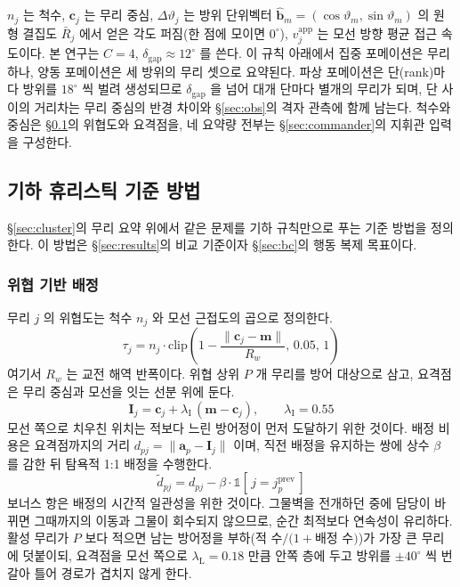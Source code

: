 $n_j$ 는 척수, $\mathbf{c}_j$ 는 무리 중심, $\Delta\vartheta_j$ 는 방위 단위벡터
$\hat{\mathbf{b}}_m = (\cos\vartheta_m, \sin\vartheta_m)$ 의 원형 결집도 $\bar{R}_j$ 에서 얻은
각도 퍼짐(한 점에 모이면 $0^\circ$), $v^{\mathrm{app}}_j$ 는 모선
방향 평균 접근 속도이다. 본 연구는 $C = 4$, $\delta_{\mathrm{gap}} \approx 12^\circ$ 를 쓴다.
이 규칙 아래에서 집중 포메이션은 무리 하나, 양동 포메이션은 세 방위의 무리 셋으로
요약된다. 파상 포메이션은 단(rank)마다 방위를 $18^\circ$ 씩 벌려 생성되므로
$\delta_{\mathrm{gap}}$ 을 넘어 대개 단마다 별개의 무리가 되며, 단 사이의 거리차는 무리
중심의 반경 차이와 \S\ref{sec:obs}의 격자 관측에 함께 남는다. 척수와 중심은
\S\ref{sec:heuristic}의 위협도와 요격점을, 네 요약량 전부는 \S\ref{sec:commander}의
지휘관 입력을 구성한다.

\subsection{기하 휴리스틱 기준 방법}
\label{sec:heuristic}

\S\ref{sec:cluster}의 무리 요약 위에서 같은 문제를 기하 규칙만으로 푸는 기준 방법을
정의한다. 이 방법은 \S\ref{sec:results}의 비교 기준이자 \S\ref{sec:bc}의 행동 복제
목표이다.

\subsubsection{위협 기반 배정}

무리 $j$ 의 위협도는 척수 $n_j$ 와 모선 근접도의 곱으로 정의한다.
\begin{equation}
\tau_j = n_j \cdot \mathrm{clip}\!\left(1 - \frac{\lVert \mathbf{c}_j - \mathbf{m}\rVert}{R_w},
         \, 0.05,\, 1\right)
\label{eq:threat}
\end{equation}
여기서 $R_w$ 는 교전 해역 반폭이다. 위협 상위 $P$ 개 무리를 방어 대상으로 삼고, 요격점은 무리 중심과 모선을 잇는
선분 위에 둔다.
\begin{equation}
\mathbf{I}_j = \mathbf{c}_j + \lambda_{\mathrm{I}}\,(\mathbf{m} - \mathbf{c}_j), \qquad \lambda_{\mathrm{I}} = 0.55
\label{eq:intercept}
\end{equation}
모선 쪽으로 치우친 위치는 적보다 느린 방어정이 먼저 도달하기 위한 것이다. 배정 비용은
요격점까지의 거리 $d_{pj} = \lVert \mathbf{a}_p - \mathbf{I}_j \rVert$ 이며, 직전 배정을
유지하는 쌍에 상수 $\beta$ 를 감한 뒤 탐욕적 1:1 배정을 수행한다.
\begin{equation}
\tilde{d}_{pj} = d_{pj} - \beta \cdot \mathbb{1}[\,j = j_p^{\text{prev}}\,]
\label{eq:sticky}
\end{equation}
보너스 항은 배정의 시간적 일관성을 위한 것이다. 그물벽을 전개하던 중에 담당이 바뀌면 그때까지의
이동과 그물이 회수되지 않으므로, 순간 최적보다 연속성이 유리하다.
활성 무리가 $P$ 보다 적으면 남는 방어정을 부하(적 수$/(1+$배정 수$)$)가 가장 큰 무리에
덧붙이되, 요격점을 모선 쪽으로 $\lambda_{\mathrm{L}} = 0.18$ 만큼 안쪽 층에 두고 방위를
$\pm 40^\circ$ 씩 번갈아 틀어 경로가 겹치지 않게 한다.


